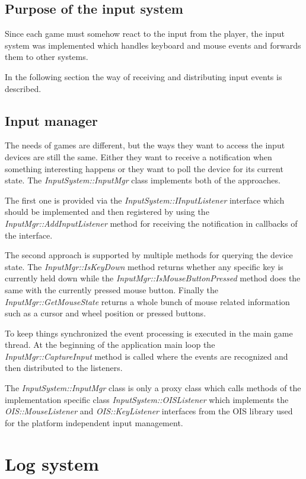 \documentclass[a4paper, 12pt]{report}
\begin{document}
\section{Purpose of the input system}

Since each game must somehow react to the input from the player, the input system was implemented which handles keyboard and mouse events and forwards them to other systems.

In the following section the way of receiving and distributing input events is described.

\section{Input manager}
The needs of games are different, but the ways they want to access the input devices are still the same. Either they want to receive a notification when something interesting happens or they want to poll the device for its current state. The \emph{InputSystem::InputMgr} class implements both of the approaches.

The first one is provided via the \emph{InputSystem::IInputListener} interface which should be implemented and then registered by using the \emph{InputMgr::\-AddInputListener} method for receiving the notification in callbacks of the interface.

The second approach is supported by multiple methods for querying the device state. The \emph{InputMgr::IsKeyDown} method returns whether any specific key is currently held down while the \emph{InputMgr::IsMouseButtonPressed} method does the same with the currently pressed mouse button. Finally the \emph{InputMgr::GetMouseState} returns a whole bunch of mouse related information such as a cursor and wheel position or pressed buttons.

To keep things synchronized the event processing is executed in the main game thread. At the beginning of the application main loop the \emph{InputMgr::CaptureInput} method is called where the events are recognized and then distributed to the listeners.

The \emph{InputSystem::InputMgr} class is only a proxy class which calls methods of the implementation specific class \emph{InputSystem::OISListener} which implements the \emph{OIS::MouseListener} and \emph{OIS::KeyListener} interfaces from the OIS library used for the platform independent input management.


\chapter{Log system}
\end{document}
